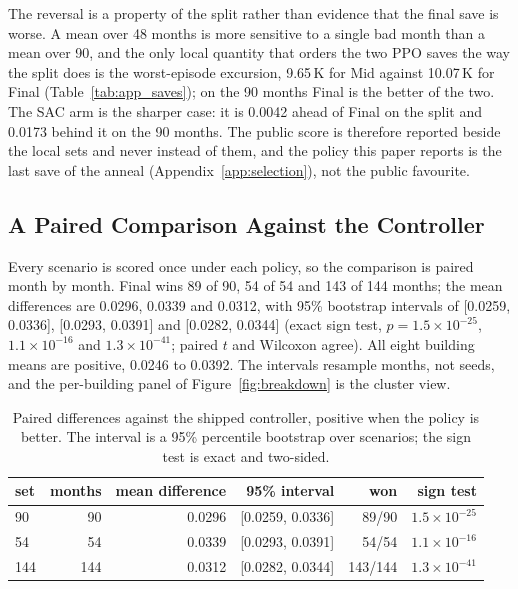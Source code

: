 \documentclass{article}
\begin{document}
The reversal is a property of the split rather than evidence that the final save is worse. A mean over 48 months is more sensitive to a single bad month than a mean over 90, and the only local quantity that orders the two PPO saves the way the split does is the worst-episode excursion, 9.65\,K for Mid against 10.07\,K for Final (Table~\ref{tab:app_saves}); on the 90 months Final is the better of the two. The SAC arm is the sharper case: it is 0.0042 ahead of Final on the split and 0.0173 behind it on the 90 months. The public score is therefore reported beside the local sets and never instead of them, and the policy this paper reports is the last save of the anneal (Appendix~\ref{app:selection}), not the public favourite.


\subsection{A Paired Comparison Against the Controller}
\label{app:paired}

Every scenario is scored once under each policy, so the comparison is paired month by month. Final wins 89 of 90, 54 of 54 and 143 of 144 months; the mean differences are 0.0296, 0.0339 and 0.0312, with 95\% bootstrap intervals of [0.0259, 0.0336], [0.0293, 0.0391] and [0.0282, 0.0344] (exact sign test, $p = 1.5\times10^{-25}$, $1.1\times10^{-16}$ and $1.3\times10^{-41}$; paired $t$ and Wilcoxon agree). All eight building means are positive, 0.0246 to 0.0392. The intervals resample months, not seeds, and the per-building panel of Figure~\ref{fig:breakdown} is the cluster view.

\begin{table}[h!]
\centering
\small
\begin{tabular}{@{}lrrrrr@{}}
\toprule
set & months & mean difference & 95\% interval & won & sign test \\
\midrule
90 & 90 & 0.0296 & [0.0259, 0.0336] & 89/90 & $1.5\times10^{-25}$ \\
54 & 54 & 0.0339 & [0.0293, 0.0391] & 54/54 & $1.1\times10^{-16}$ \\
144 & 144 & 0.0312 & [0.0282, 0.0344] & 143/144 & $1.3\times10^{-41}$ \\
\bottomrule
\end{tabular}
\vspace{4pt}
\caption{Paired differences against the shipped controller, positive when the policy is better. The interval is a 95\% percentile bootstrap over scenarios; the sign test is exact and two-sided.}
\label{tab:app_paired}
\end{table}
\end{document}
